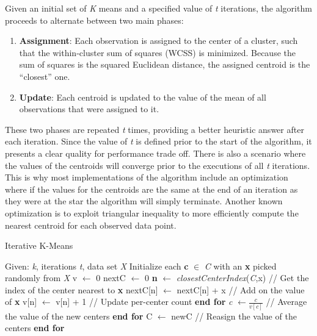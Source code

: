 \documentclass{l4proj}
\begin{document}
Given an initial set of \textit{K} means and a specified value of \textit{t} iterations, the algorithm proceeds to alternate between two main phases:

\begin{enumerate}
\item \textbf{Assignment}: Each observation is assigned to the center of a cluster, such that the within-cluster sum of squares (WCSS) is minimized. Because the sum of squares is the squared Euclidean distance, the assigned centroid is the ``closest'' one.
\item \textbf{Update}: Each centroid is updated to the value of the mean of all observations that were assigned to it. 
\end{enumerate}

These two phases are repeated \textit{t} times, providing a better heuristic answer after each iteration. Since the value of \textit{t} is defined prior to the start of the algorithm, it presents a clear quality for performance trade off. There is also a scenario where the values of the centroids will converge prior to the executions of all \textit{t} iterations. This is why most implementations of the algorithm include an optimization where if the values for the centroids are the same at the end of an iteration as they were at the star the algorithm will simply terminate. Another known optimization is to exploit triangular inequality to more efficiently compute the nearest centroid for each observed data point\cite{Triangle}. 

\begin{algorithm}
\caption{Iterative K-Means}\label{iterative}
\begin{algorithmic}[1]
\State Given: \textit{k}, iterations \textit{t}, data set \textit{X}
\State Initialize each \textbf{c} $\in$ \textit{C} with an \textbf{x} picked randomly from \textit{X}
    \State v $\gets$ 0
    \State nextC $\gets$ 0
        \State \textbf{n} $\gets$ \textit{closestCenterIndex}(\textit{C},x) \hspace{0.4cm} // Get the index of the center nearest to \textbf{x}
        \State nextC[n] $\gets$ nextC[n] + x \hspace{1cm} // Add on the value of \textbf{x}
        \State v[n] $\gets$ v[n] + 1 \hspace{2.4cm} // Update per-center count
    \EndFor
    \State \textbf{end for}
        \State \textit{c} $\gets \frac{\textit{c}}{v[\textit{c}]}$ \hspace{1cm} // Average the value of the new centers
    \EndFor
    \State \textbf{end for}
    \State C $\gets$ newC \hspace{1.2cm} // Reasign the value of the centers
\EndFor
\State \textbf{end for}
\end{algorithmic}
\end{algorithm}
\end{document}
